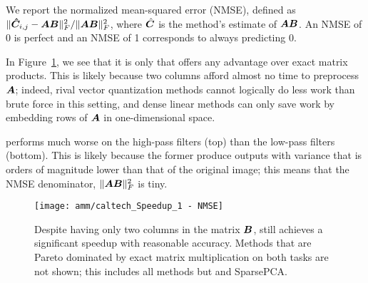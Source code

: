 
We report the normalized mean-squared error (NMSE), defined as $\lVert\bm{\hat{C}}_{i,j} - \bm{A}\bm{B}\rVert^2_F / \lVert\bm{A}\bm{B}\rVert^2_F$, where $\hat{\bm{C}}$ is the method's estimate of $\bm{A}\bm{B}$. An NMSE of 0 is perfect and an NMSE of 1 corresponds to always predicting 0.

In Figure~\ref{fig:caltech}, we see that it is only \oursp that offers any advantage over exact matrix products. This is likely because two columns afford almost no time to preprocess $\bm{A}$; indeed, rival vector quantization methods cannot logically do less work than brute force in this setting, and dense linear methods can only save work by embedding rows of $\bm{A}$ in one-dimensional space.

\oursp performs much worse on the high-pass filters (top) than the low-pass filters (bottom). This is likely because the former produce outputs with variance that is orders of magnitude lower than that of the original image; this means that the NMSE denominator, $\lVert\bm{A}\bm{B}\rVert^2_F$ is tiny.  %

\begin{figure}[h]
\begin{center}
\texttt{[image: amm/caltech\_Speedup\_1 - NMSE]}
\caption{Despite having only two columns in the matrix $\bm{B}$, \oursp still achieves a significant speedup with reasonable accuracy. Methods that are Pareto dominated by exact matrix multiplication on both tasks are not shown; this includes all methods but \oursp and SparsePCA.} %
\label{fig:caltech}
\end{center}
\end{figure}


